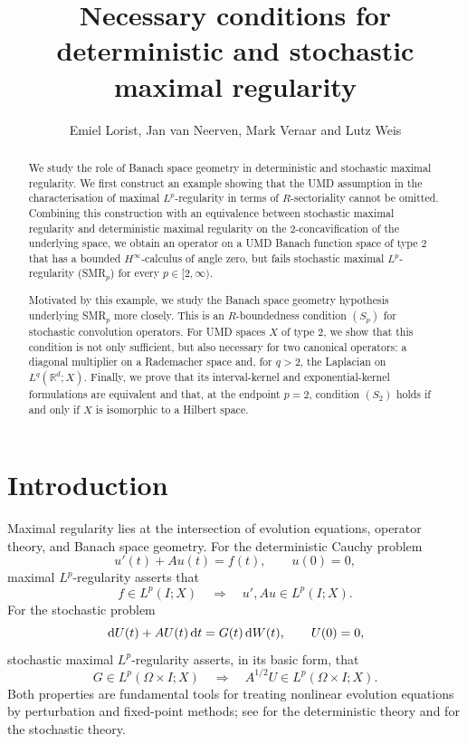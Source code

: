 \documentclass{amsart}
\title[Necessary conditions for maximal regularity]
{Necessary conditions for deterministic and stochastic maximal regularity}
\author{Emiel Lorist, Jan van Neerven,  Mark Veraar and Lutz Weis}
\theoremstyle{plain}
\theoremstyle{remark}
\theoremstyle{plain}
\numberwithin{equation}{section}
\newcommand{\1}{\mathbf 1}
\newcommand{\dd}{\,{\rm d}}
\begin{document}
\begin{abstract}
We study the role of Banach space geometry in deterministic and stochastic maximal regularity. We first construct an example showing that the UMD assumption in the characterisation of maximal $L^p$-regularity in terms of $R$-sectoriality cannot be omitted. Combining this construction with an equivalence between stochastic maximal regularity and deterministic maximal regularity on the $2$-concavification of the underlying space, we obtain an operator on a UMD Banach function space of type $2$ that has a bounded $H^\infty$-calculus of angle zero, but fails stochastic maximal $L^p$-regularity (SMR$_p$) for every $p\in[2,\infty)$.

Motivated by this example, we study the Banach space geometry hypothesis underlying SMR$_p$ more closely. This is an $R$-boundedness condition $(S_p)$ for stochastic convolution operators. For UMD spaces $X$ of type $2$, we show that this condition is not only sufficient, but also necessary for two canonical operators: a diagonal multiplier on a Rademacher space and, for $q>2$, the Laplacian on $L^q(\mathbb R^d;X)$. Finally, we prove that its interval-kernel and exponential-kernel formulations are equivalent and that, at the endpoint $p=2$, condition $(S_2)$ holds if and only if $X$ is isomorphic to a Hilbert space.
\end{abstract}



\maketitle


\section{Introduction}

Maximal regularity lies at the intersection of evolution equations,
operator theory, and Banach space geometry. For the deterministic Cauchy
problem
\[
        u'(t)+Au(t)=f(t),\qquad u(0)=0,
\]
maximal $L^p$-regularity asserts that
\[
     f\in L^p(I;X) \quad\Longrightarrow\quad  u',Au\in L^p(I;X).
\]
For the stochastic problem
\[
        \dd U(t)+AU(t)\dd t=G(t)\dd W(t),\qquad U(0)=0,
\]
stochastic maximal $L^p$-regularity asserts, in its basic form, that
\[
        G\in L^p(\Omega\times I;X)
        \quad\Longrightarrow\quad
        A^{1/2}U\in L^p(\Omega\times I;X).
\]
Both properties are fundamental tools for treating nonlinear evolution
equations by perturbation and fixed-point methods; see
\cite{HNVW3,pruss2016moving} for the deterministic theory and
\cite{AVsurvey} for the stochastic theory.
\end{document}

